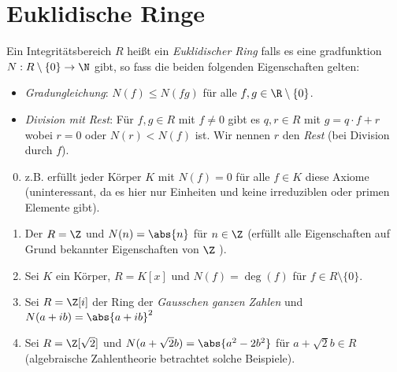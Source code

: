 \section{Euklidische Ringe}
\begin{definition}
	Ein Integritätsbereich $R$ heißt ein \emph{Euklidischer Ring} falls es eine gradfunktion $N: R \setminus \{0\}  \to \N$ gibt,
	so fass die beiden folgenden Eigenschaften gelten:
	\begin{itemize}
		\item \emph{Gradungleichung}: $N(f) \leq N(fg)$ für alle $f,g \in \R \setminus \{0\} $.
		\item \emph{Division mit Rest}: Für $f,g \in R$ mit $f \neq  0$ gibt es $q,r \in R$ mit $g = q\cdot f + r$ wobei $r = 0$ oder $N(r) < N(f)$ ist.
			Wir nennen $r$ den \emph{Rest} (bei Division durch $f $).
	\end{itemize}
\end{definition}

\begin{eg}
	\begin{enumerate}[1)]
		\setcounter{enumi}{-1}
		\item z.B. erfüllt jeder Körper $K$ mit $N(f) = 0$ für alle $f \in K$ diese Axiome
			(uninteressant, da es hier nur Einheiten und keine irreduziblen oder primen Elemente gibt).
		\item Der $R = \Z$ und $N(n) = \abs{n}$ für $n \in \Z$ (erfüllt alle Eigenschaften auf Grund bekannter Eigenschaften von $\Z$ ).
		\item Sei  $K$ ein Körper, $R=K[x]$ und $N(f) = \deg(f)$ für $f \in R \setminus \{0\} $.
		\item Sei $R = \Z[i]$ der Ring der \emph{Gausschen ganzen Zahlen} und $N(a+ib) = \abs{a+ib}^2$
		\item Sei $R = \Z[\sqrt{2}]$ und $N(a + \sqrt{2} b) = \abs{a^2 - 2 b^2}$ für $a + \sqrt{2} b \in R$ (algebraische Zahlentheorie betrachtet solche Beispiele).
	\end{enumerate}
\end{eg}

